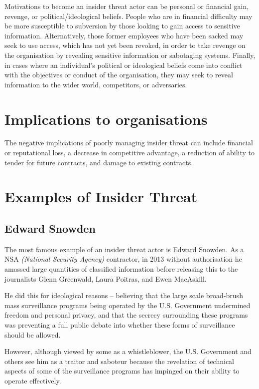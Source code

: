 \documentclass[12pt]{report}
\begin{document}
Motivations to become an insider threat actor can be personal or financial gain, revenge, or political/ideological beliefs. People who are in financial difficulty may be more susceptible to subversion by those looking to gain access to sensitive information. Alternatively, those former employees who have been sacked may seek to use access, which has not yet been revoked, in order to take revenge on the organisation by revealing sensitive information or sabotaging systems. Finally, in cases where an individual's political or ideological beliefs come into conflict with the objectives or conduct of the organisation, they may seek to reveal information to the wider world, competitors, or adversaries.

\section{Implications to organisations}
The negative implications of poorly managing insider threat can include financial or reputational loss, a decrease in competitive advantage, a reduction of ability to tender for future contracts, and damage to existing contracts.

\section{Examples of Insider Threat}
\subsection*{Edward Snowden}
The most famous example of an insider threat actor is Edward Snowden. As a NSA \textit{(National Security Agency)} contractor, in 2013 without authorisation he amassed large quantities of classified information before releasing this to the journalists Glenn Greenwald, Laura Poitras, and Ewen MacAskill.

He did this for ideological reasons -- believing that the large scale broad-brush mass surveillance programs being operated by the U.S. Government undermined freedom and personal privacy, and that the secrecy surrounding these programs was preventing a full public debate into whether these forms of surveillance should be allowed.

However, although viewed by some as a whistleblower, the U.S. Government and others see him as a traitor and saboteur because the revelation of technical aspects of some of the surveillance programs has impinged on their ability to operate effectively.
\end{document}
